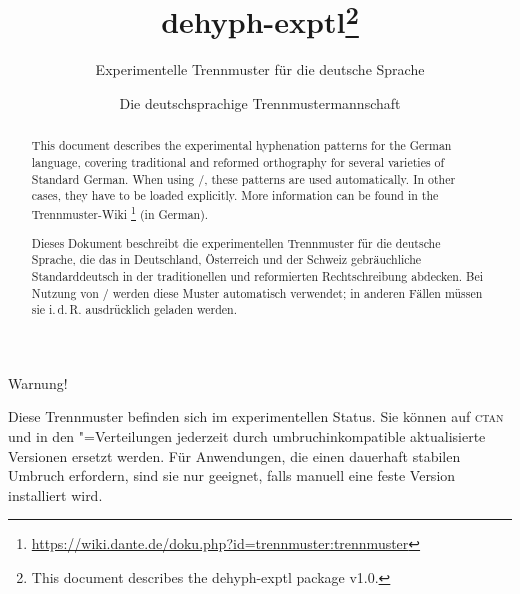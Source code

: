 \documentclass[11pt,
               DIV=9,
               toc=flat,
               captions=tableheading,
               abstract=on]{scrartcl}
\newcommand*{\Abk}[1]{\mbox{\textsc{\lsstyle#1}}}
\newcommand*{\Paket}[1]{\textsf{#1}}
\begin{document}


\author{Die deutschsprachige Trennmustermannschaft}
\title{\Paket{dehyph-exptl}\thanks{This document describes the
    \Paket{dehyph-exptl} package v1.0.}}
\subtitle{Experimentelle Trennmuster für die deutsche Sprache}
\maketitle

\begin{abstract}
  This document describes the experimental hyphenation patterns for
  the German language, covering traditional and reformed orthography
  for several varieties of Standard German.  When using
  /, these patterns are used
  automatically.  In other cases, they have to be loaded explicitly.
  More information can be found in the Trennmuster-Wiki%
  \footnote{\url{https://wiki.dante.de/doku.php?id=trennmuster:trennmuster}}
  (in German).
\end{abstract}

\begin{abstract}
  Dieses Dokument beschreibt die experimentellen Trennmuster für die
  deutsche Sprache, die das in Deutschland, Österreich und der Schweiz
  gebräuchliche Standarddeutsch in der traditionellen und reformierten
  Rechtschreibung abdecken.  Bei Nutzung von
  / werden diese Muster automatisch
  verwendet; in anderen Fällen müssen sie i.\,d.\,R. ausdrücklich
  geladen werden.
\end{abstract}

\vfill
\begingroup
\em\large

\begin{center}
  Warnung!
\end{center}

Diese Trennmuster befinden sich im experimentellen Status.  Sie können
auf \Abk{ctan} und in den "=Verteilungen jederzeit
durch umbruchinkompatible aktualisierte Versionen ersetzt werden.  Für
Anwendungen, die einen dauerhaft stabilen Umbruch erfordern, sind sie
nur geeignet, falls manuell eine feste Version installiert wird.
\endgroup \vfill
\end{document}
